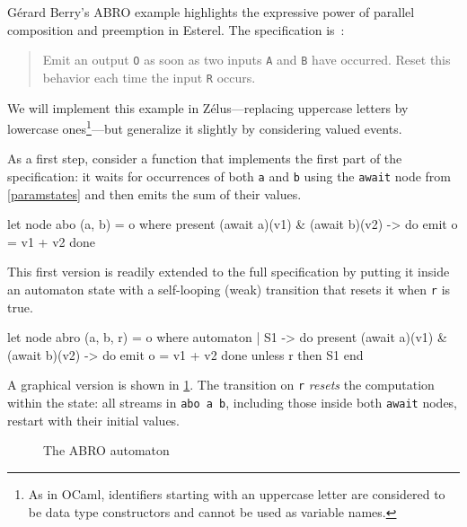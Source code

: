 \documentclass[11pt,titlepage,twoside]{report}
\makeatletter
\newcommand{\zls}[1]{{\@span{class="zelusinline"}#1}}
\newcommand{\zls}[1]{\texttt{#1}}
\renewcommand{\zls}[1]{\texttt{#1}}
\newcommand{\zelus}{{\sf Z\'elus}}
\newcommand{\ocaml}{{\sf OCaml}}
\makeatother
\begin{document}
Gérard Berry's ABRO example highlights the expressive power of parallel 
composition and preemption in Esterel. The specification 
is~\cite[]{esterel:primer99}:
\begin{quote}
Emit an output \zls{O} as soon as two inputs \zls{A} and \zls{B} have 
occurred.
Reset this behavior each time the input \zls{R} occurs.
\end{quote}
We will implement this example in \zelus---replacing uppercase letters by 
lowercase ones\footnote{As in \ocaml, identifiers starting with an uppercase 
letter are considered to be data type constructors and cannot be used as 
variable names.}---but generalize it slightly by considering valued events.

%
As a first step, consider a function that implements the first part of 
the specification: it waits for occurrences of both \zls{a} and \zls{b} 
using the \zls{await} node from \cref{paramstates} and then emits the sum of 
their values.
\begin{chklisting}[withresult,include=await,label=abo]
let node abo (a, b) = o where
  present (await a)(v1) & (await b)(v2) -> do emit o = v1 + v2 done
\end{chklisting}
This first version is readily extended to the full specification by putting 
it inside an automaton state with a self-looping (weak) transition that 
resets it when \zls{r} is true.
\begin{chklisting}
let node abro (a, b, r) = o where
  automaton
  | S1 ->
       do
         present (await a)(v1) & (await b)(v2) -> do emit o = v1 + v2 done
       unless r then S1
  end
\end{chklisting}
A graphical version is shown in \cref{abro-figure}.
The transition on \zls{r} \emph{resets} the computation within the state: 
all streams in \zls{abo a b}, including those inside both \zls{await} nodes, 
restart with their initial values.
\begin{figure}[t]
\centering%
\caption{The ABRO automaton~\label{abro-figure}}
\end{figure}
\end{document}
